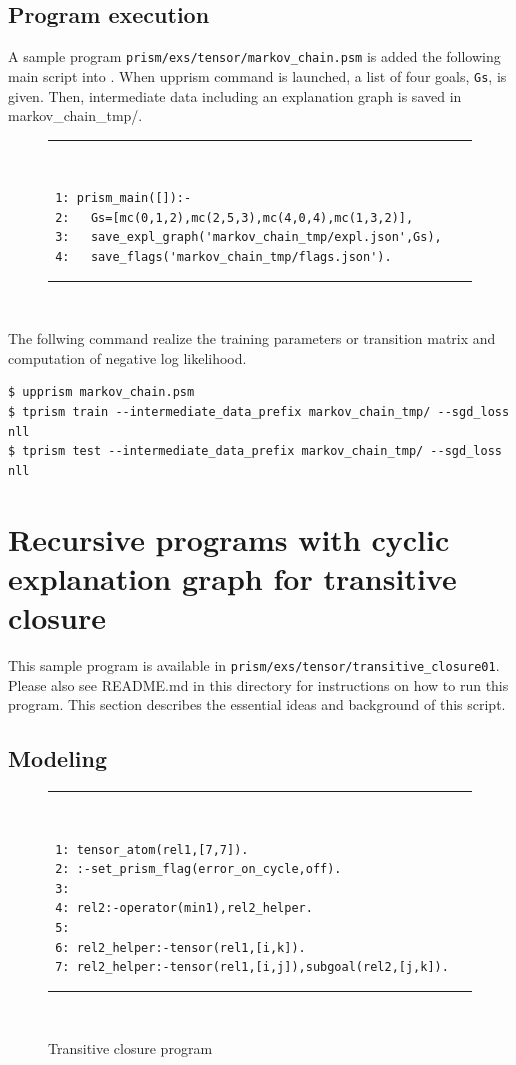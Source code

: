 \documentclass[a4paper]{report}
\begin{document}
\subsection*{Program execution}

A sample program {\tt prism/exs/tensor/markov\_chain.psm} is added the following main script into .
When upprism command is launched, a list of four goals, {\tt Gs}, is given.
Then, intermediate data including an explanation graph is saved in {markov\_chain\_tmp/}.

\begin{figure}[h]
	\rule{0.85\textwidth}{0.10mm}\\ [-1em]
\begin{verbatim}
 1: prism_main([]):-
 2:   Gs=[mc(0,1,2),mc(2,5,3),mc(4,0,4),mc(1,3,2)],
 3:   save_expl_graph('markov_chain_tmp/expl.json',Gs),
 4:   save_flags('markov_chain_tmp/flags.json').	
\end{verbatim}
\rule{0.85\textwidth}{0.10mm}\\ [-1em]
\end{figure}

The follwing command realize the training parameters or transition matrix and computation of negative log likelihood.
\begin{verbatim}
$ upprism markov_chain.psm
$ tprism train --intermediate_data_prefix markov_chain_tmp/ --sgd_loss nll
$ tprism test --intermediate_data_prefix markov_chain_tmp/ --sgd_loss nll
\end{verbatim}

\section{Recursive programs with cyclic explanation graph for transitive closure}
\label{sec:transitive_closure01}

This sample program is available in \verb|prism/exs/tensor/transitive_closure01|.
Please also see README.md in this directory for instructions on how to run this program.
This section describes the essential ideas and background of this script. 


\subsection*{Modeling}

\begin{figure}[tb]
	\rule{0.85\textwidth}{0.10mm}\\ [-1em]
	\begin{verbatim}
 1: tensor_atom(rel1,[7,7]).
 2: :-set_prism_flag(error_on_cycle,off).
 3:
 4: rel2:-operator(min1),rel2_helper.
 5: 
 6: rel2_helper:-tensor(rel1,[i,k]).
 7: rel2_helper:-tensor(rel1,[i,j]),subgoal(rel2,[j,k]).
	\end{verbatim}
	\rule{0.85\textwidth}{0.10mm}\\ [-1em]
	\caption{Transitive closure program}
	\label{fig:tc}
\end{figure}
\end{document}
